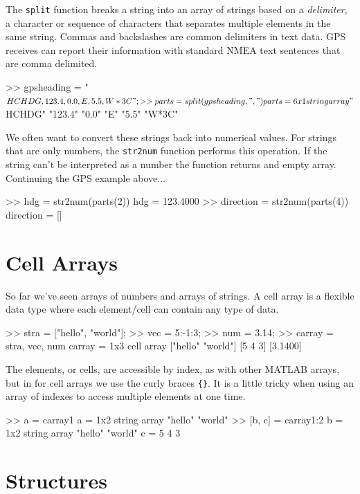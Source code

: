 \documentclass[../../book.tex]{subfiles}
\begin{document}
The \lstinline{split} function breaks a string into an array of strings based on a \emph{delimiter}, a character or sequence of characters that separates multiple elements in the same string.  Commas and backslashes are common delimiters in text data.  GPS receives can report their information with standard NMEA text sentences that are comma delimited.  

\begin{code}
>> gpsheading = "$HCHDG,123.4,0.0,E,5.5,W*3C";
>> parts = split(gpsheading, ",")
parts = 
  6x1 string array
    "$HCHDG"
    "123.4"
    "0.0"
    "E"
    "5.5"
    "W*3C"
\end{code}

We often want to convert these strings back into numerical values.  For strings that are only numbers, the \lstinline{str2num} function performs this operation.   If the string can't be interpreted as a number the function returns and empty array.  Continuing the GPS example above...
\begin{code}
>> hdg = str2num(parts(2))
    hdg =
      123.4000
>> direction = str2num(parts(4))
    direction =
         [] 
\end{code}

\section{Cell Arrays}

So far we've seen arrays of numbers and arrays of strings.  A cell array is a flexible data type where each element/cell can contain any type of data.
\begin{code}
>> stra = ["hello", "world"];
>> vec = 5:-1:3;
>> num = 3.14;
>> carray = {stra, vec, num}
carray =
  1x3 cell array
    {["hello"    "world"]}    {[5 4 3]}    {[3.1400]}
\end{code}

The elements, or cells, are accessible by index, as with other MATLAB arrays, but in for cell arrays we use the curly braces \lstinline|{}|.  It is a little tricky when using an array of indexes to access multiple elements at one time.
\begin{code}
    >> a = carray{1}
    a = 
      1x2 string array
        "hello"    "world"
    >> [b, c]  = carray{1:2}
    b = 
      1x2 string array
        "hello"    "world"
    c =
         5     4     3

\end{code}

\section{Structures}
\end{document}
